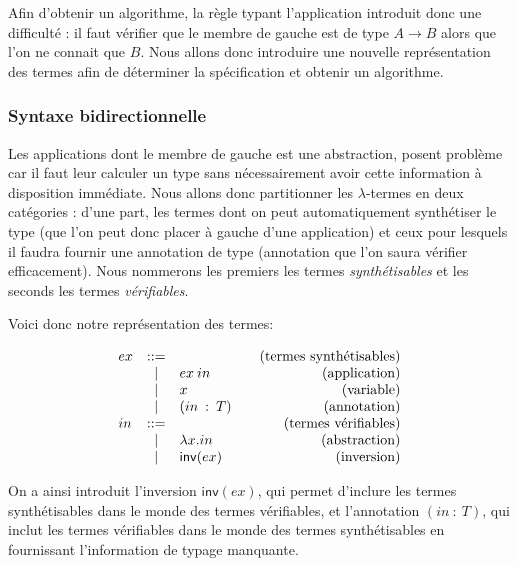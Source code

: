 \documentclass {article}
\makeatletter
\theoremstyle{definition}
\theoremstyle{remark}
\newenvironment{bnf}
               {\[\begin{array}{lcl@{\qquad}r}}
               {\end{array}\]}
\makeatother
\begin{document}
Afin d'obtenir un algorithme, la règle typant l'application introduit
donc une difficulté : il faut vérifier que le membre de gauche est de
type $A \rightarrow B$ alors que l'on ne connait que $B$. Nous allons
donc introduire une nouvelle représentation des termes afin de
déterminer la spécification et obtenir un algorithme.

\subsubsection{Syntaxe bidirectionnelle}


Les applications dont le membre de gauche est une abstraction, posent
problème car il faut leur calculer un type sans nécessairement avoir cette information à disposition immédiate.  Nous
allons donc partitionner les \(\lambda\)-termes en deux catégories :
d'une part, les termes dont on peut automatiquement synthétiser le
type (que l'on peut donc placer à gauche d'une application) et ceux
pour lesquels il faudra fournir une annotation de type (annotation que l'on saura vérifier efficacement).
Nous nommerons les premiers
les termes \emph{synthétisables} et les seconds les  termes
\emph{vérifiables}. 

\newcommand{\Inv}[1]{\ensuremath{\mathsf{inv}(#1)}}
\newcommand{\Ann}[2]{\ensuremath{(#1\: :\: #2)}}

Voici donc notre représentation des termes:
 
\begin{bnf}
  ex &::= &&\mbox{(termes synthétisables)} \\
  &|& \App{ex}{in} & \mbox{(application)} \\
  &|& \Var{x} & \mbox{(variable)} \\
  &|& \Ann{in}{T} & \mbox{(annotation)} \\
  in &::= &&\mbox{(termes vérifiables)} \\
  &|& \Lam{x}{in} & \mbox{(abstraction)} \\
  &|& \Inv{ex} & \mbox{(inversion)}
\end{bnf}


On a ainsi introduit l'inversion \Inv{ex}, qui permet d'inclure les
termes synthétisables dans le monde des termes vérifiables, et l'annotation \Ann{in}{T}, qui inclut les termes
vérifiables dans le monde des termes synthétisables en fournissant
l'information de typage manquante.

\newcommand{\verif}{vérification de type}
\newcommand{\synth}{synthèse de type}
\newcommand{\verifterme}{termes vérifiables}
\newcommand{\synthterme}{termes synthétisables}
\end{document}
